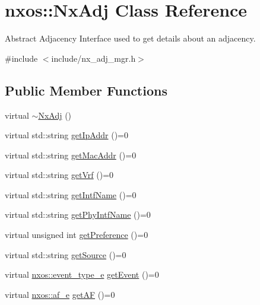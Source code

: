 \hypertarget{classnxos_1_1_nx_adj}{}\section{nxos\+:\+:Nx\+Adj Class Reference}
\label{classnxos_1_1_nx_adj}


Abstract Adjacency Interface used to get details about an adjacency.  




{\ttfamily \#include $<$include/nx\+\_\+adj\+\_\+mgr.\+h$>$}

\subsection*{Public Member Functions}
\begin{DoxyCompactItemize}
\item 
virtual \mbox{\hyperlink{classnxos_1_1_nx_adj_a308082669b2c45fe0bc3ae8ceedacdb6}{$\sim$\+Nx\+Adj}} ()
\item 
virtual std\+::string \mbox{\hyperlink{classnxos_1_1_nx_adj_a21e819518fd33c40436a6e2df427f064}{get\+Ip\+Addr}} ()=0
\item 
virtual std\+::string \mbox{\hyperlink{classnxos_1_1_nx_adj_ad35857c95529b40fbaf363bd6aebc0ec}{get\+Mac\+Addr}} ()=0
\item 
virtual std\+::string \mbox{\hyperlink{classnxos_1_1_nx_adj_a0928d29814a978c7b8b825fcc99b1fb1}{get\+Vrf}} ()=0
\item 
virtual std\+::string \mbox{\hyperlink{classnxos_1_1_nx_adj_ada50b00bb73ea35a3282481c949187d2}{get\+Intf\+Name}} ()=0
\item 
virtual std\+::string \mbox{\hyperlink{classnxos_1_1_nx_adj_aaf3b120882857af70467cd02dc01a844}{get\+Phy\+Intf\+Name}} ()=0
\item 
virtual unsigned int \mbox{\hyperlink{classnxos_1_1_nx_adj_a53629d8a995e5ab54ed63d175f5ab6cf}{get\+Preference}} ()=0
\item 
virtual std\+::string \mbox{\hyperlink{classnxos_1_1_nx_adj_a1f60bed95c387db33eba7ae4b48c965d}{get\+Source}} ()=0
\item 
virtual \mbox{\hyperlink{nx__common_8h_af9a9040b7681199d386e94eb888018cb}{nxos\+::event\+\_\+type\+\_\+e}} \mbox{\hyperlink{classnxos_1_1_nx_adj_a75c503c316c39c12aa8b4c431c81d2de}{get\+Event}} ()=0
\item 
virtual \mbox{\hyperlink{nx__common_8h_a3a667f48b94db10aa398940dc5bf72d7}{nxos\+::af\+\_\+e}} \mbox{\hyperlink{classnxos_1_1_nx_adj_a5e026c5187f3a88337790ad5d7cb4e5b}{get\+AF}} ()=0

\end{DoxyCompactItemize}
